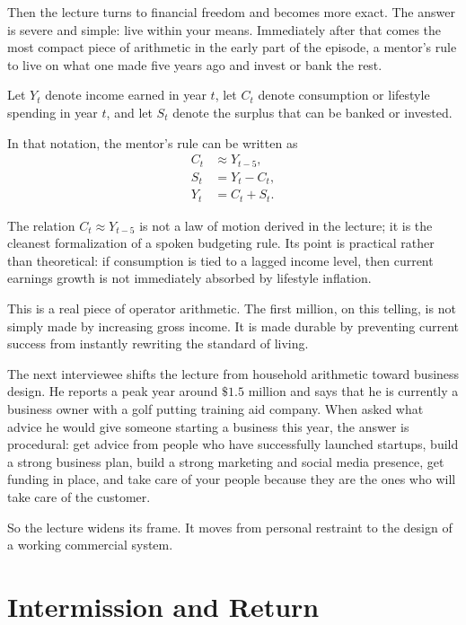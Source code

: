 Then the lecture turns to financial freedom and becomes more exact. The answer is severe and simple: live within your means. Immediately after that comes the most compact piece of arithmetic in the early part of the episode, a mentor's rule to live on what one made five years ago and invest or bank the rest.

\begin{definition}
Let \(Y_t\) denote income earned in year \(t\), let \(C_t\) denote consumption or lifestyle spending in year \(t\), and let \(S_t\) denote the surplus that can be banked or invested.
\end{definition}

In that notation, the mentor's rule can be written as
\begin{align}
C_t &\approx Y_{t-5},\\
S_t &= Y_t - C_t,\\
Y_t &= C_t + S_t.
\end{align}

\begin{remark}
The relation \(C_t \approx Y_{t-5}\) is not a law of motion derived in the lecture; it is the cleanest formalization of a spoken budgeting rule. Its point is practical rather than theoretical: if consumption is tied to a lagged income level, then current earnings growth is not immediately absorbed by lifestyle inflation.
\end{remark}

This is a real piece of operator arithmetic. The first million, on this telling, is not simply made by increasing gross income. It is made durable by preventing current success from instantly rewriting the standard of living.

The next interviewee shifts the lecture from household arithmetic toward business design. He reports a peak year around \( \$1.5 \) million and says that he is currently a business owner with a golf putting training aid company. When asked what advice he would give someone starting a business this year, the answer is procedural: get advice from people who have successfully launched startups, build a strong business plan, build a strong marketing and social media presence, get funding in place, and take care of your people because they are the ones who will take care of the customer.

So the lecture widens its frame. It moves from personal restraint to the design of a working commercial system.

\section{Intermission and Return}


